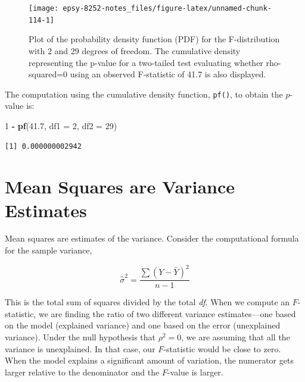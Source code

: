 \documentclass[]{book}
\newenvironment{Shaded}{\begin{snugshade}}{\end{snugshade}}
\newcommand{\DataTypeTok}[1]{\textcolor[rgb]{0.13,0.29,0.53}{#1}}
\newcommand{\DecValTok}[1]{\textcolor[rgb]{0.00,0.00,0.81}{#1}}
\newcommand{\FloatTok}[1]{\textcolor[rgb]{0.00,0.00,0.81}{#1}}
\newcommand{\KeywordTok}[1]{\textcolor[rgb]{0.13,0.29,0.53}{\textbf{#1}}}
\newcommand{\NormalTok}[1]{#1}
\newcommand{\OperatorTok}[1]{\textcolor[rgb]{0.81,0.36,0.00}{\textbf{#1}}}
\newcommand{\StringTok}[1]{\textcolor[rgb]{0.31,0.60,0.02}{#1}}
\begin{document}
\begin{figure}

{\centering \texttt{[image: epsy-8252-notes\_files/figure-latex/unnamed-chunk-114-1]} 

}

\caption{Plot of the probability density function (PDF) for the F-distribution with 2 and 29 degrees of freedom. The cumulative density representing the p-value for a two-tailed test evaluating whether rho-squared=0 using an observed F-statistic of 41.7 is also displayed.}\label{fig:unnamed-chunk-114}
\end{figure}

The computation using the cumulative density function, \texttt{pf()}, to obtain the \(p\)-value is:

\begin{Shaded}
\begin{Highlighting}[]
\DecValTok{1} \OperatorTok{-}\StringTok{ }\KeywordTok{pf}\NormalTok{(}\FloatTok{41.7}\NormalTok{, }\DataTypeTok{df1 =} \DecValTok{2}\NormalTok{, }\DataTypeTok{df2 =} \DecValTok{29}\NormalTok{)}
\end{Highlighting}
\end{Shaded}

\begin{verbatim}
[1] 0.000000002942
\end{verbatim}

\hypertarget{mean-squares-are-variance-estimates}{%
\section{Mean Squares are Variance Estimates}\label{mean-squares-are-variance-estimates}}

Mean squares are estimates of the variance. Consider the computational formula for the sample variance,

\[
\hat{\sigma}^2 = \frac{\sum(Y - \bar{Y})^2}{n-1}
\]

This is the total sum of squares divided by the total \emph{df}. When we compute an \(F\)-statistic, we are finding the ratio of two different variance estimates---one based on the model (explained variance) and one based on the error (unexplained variance). Under the null hypothesis that \(\rho^2 = 0\), we are assuming that all the variance is unexplained. In that case, our \(F\)-statistic would be close to zero. When the model explains a significant amount of variation, the numerator gets larger relative to the denominator and the \(F\)-value is larger.
\end{document}
